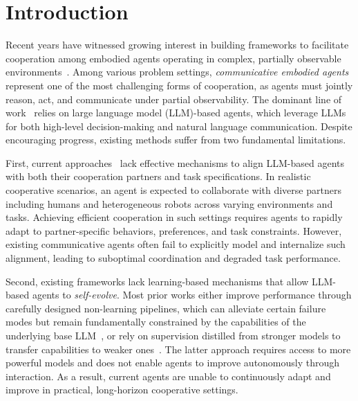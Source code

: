 \documentclass{article}
\theoremstyle{plain}
\theoremstyle{definition}
\theoremstyle{remark}
\begin{document}
\section{Introduction}

Recent years have witnessed growing interest in building frameworks to facilitate cooperation among embodied agents operating in complex, partially observable environments~\cite{wah, thomason2020vision, habitat3, partnr}. Among various problem settings, \emph{communicative embodied agents} represent one of the most challenging forms of cooperation, as agents must jointly reason, act, and communicate under partial observability. The dominant line of work~\cite{roco, coela, capo, guo2024embodiedllmagentslearn, cots, ling2025elhplan} relies on large language model (LLM)-based agents, which leverage LLMs for both high-level decision-making and natural language communication. Despite encouraging progress, existing methods suffer from two fundamental limitations. 

First, current approaches~\cite{coela, capo, cots} lack effective mechanisms to align LLM-based agents with both their cooperation partners and task specifications. In realistic cooperative scenarios, an agent is expected to collaborate with diverse partners including humans and heterogeneous robots across varying environments and tasks. Achieving efficient cooperation in such settings requires agents to rapidly adapt to partner-specific behaviors, preferences, and task constraints. However, existing communicative agents often fail to explicitly model and internalize such alignment, leading to suboptimal coordination and degraded task performance.

Second, existing frameworks lack learning-based mechanisms that allow LLM-based agents to \emph{self-evolve}. Most prior works either improve performance through carefully designed non-learning pipelines, which can alleviate certain failure modes but remain fundamentally constrained by the capabilities of the underlying base LLM~\cite{capo, cots, ling2025elhplan, li2025learn}, or rely on supervision distilled from stronger models to transfer capabilities to weaker ones~\cite{coela, partnr}. The latter approach requires access to more powerful models and does not enable agents to improve autonomously through interaction. As a result, current agents are unable to continuously adapt and improve in practical, long-horizon cooperative settings.
\end{document}
